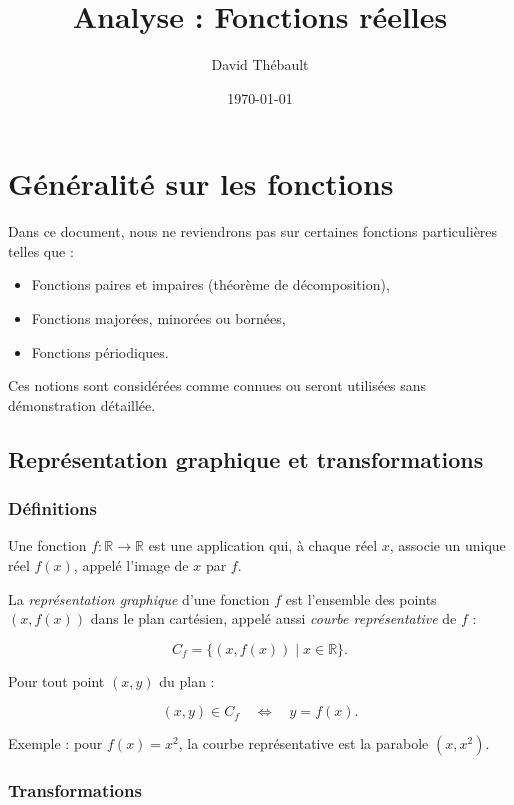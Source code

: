 \documentclass{report} %
\title{Analyse : Fonctions réelles}
\author{David Thébault}
\date{\today}
\theoremstyle{definition}  %
\theoremstyle{plain} %
\theoremstyle{remark} %
\begin{document}
\maketitle

\chapter{Généralité sur les fonctions}

\medskip


Dans ce document, nous ne reviendrons pas sur certaines fonctions particulières telles que :
\begin{itemize}
    \item Fonctions paires et impaires (théorème de décomposition),
    \item Fonctions majorées, minorées ou bornées,
    \item Fonctions périodiques.
\end{itemize}
Ces notions sont considérées comme connues ou seront utilisées sans démonstration détaillée.

\bigskip

\section{Représentation graphique et transformations}

\subsection{Définitions}

Une fonction \(f : \mathbb{R} \to \mathbb{R}\) est une application qui, à chaque réel \(x\), associe un unique réel \(f(x)\), appelé l'image de \(x\) par \(f\).  

La \emph{représentation graphique} d'une fonction \(f\) est l'ensemble des points \((x, f(x))\) dans le plan cartésien, appelé aussi \emph{courbe représentative} de \(f\) :

\[
C_f = \{(x, f(x)) \mid x \in \mathbb{R}\}.
\]

Pour tout point \((x,y)\) du plan :

\[
(x,y) \in C_f \quad \Leftrightarrow \quad y = f(x).
\]

Exemple : pour \(f(x) = x^2\), la courbe représentative est la parabole \((x,x^2)\).  


\subsection{Transformations}
\end{document}
